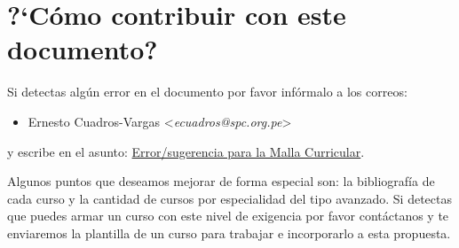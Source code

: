 \section*{?`Cómo contribuir con este documento?}
%

Si detectas algún error en el documento por favor infórmalo a los correos: 

\begin{itemize}
\item Ernesto Cuadros-Vargas <\textit{ecuadros@spc.org.pe}>
\end{itemize}
y escribe en el asunto: \underline{Error/sugerencia para la Malla Curricular}.

Algunos puntos que deseamos mejorar de forma especial son: la bibliografí­a de cada 
curso y la cantidad de cursos por especialidad del tipo avanzado. Si detectas que 
puedes armar un curso con este nivel de exigencia por favor contáctanos y te enviaremos 
la plantilla de un curso para trabajar e incorporarlo a esta propuesta.


